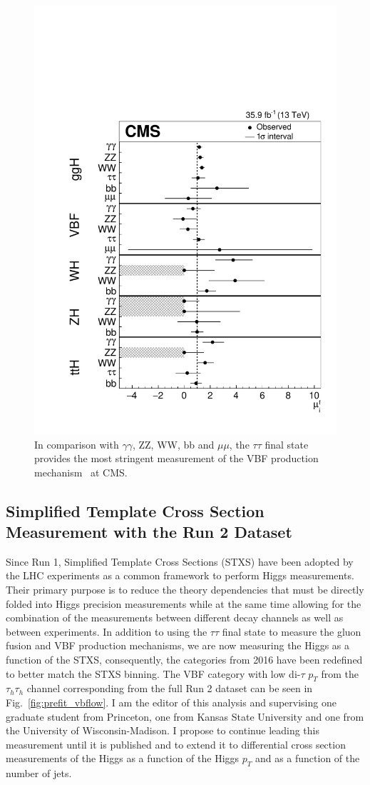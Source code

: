 \documentclass[preprint,12pt]{elsarticle}
\begin{document}
\begin{figure}[h]
\centering\includegraphics[width=0.4\linewidth]{CMS-HIG-17-031_Figure_006_VBF_Comparison.pdf}
\caption{In comparison with $\gamma\gamma$, ZZ, WW, bb and $\mu\mu$, the $\tau\tau$ final state provides the most stringent measurement of the VBF production mechanism~\cite{Sirunyan:2018koj} at CMS.}
\label{fig:Sirunyan2018koj}
\end{figure}

\subsection{Simplified Template Cross Section Measurement with the Run 2 Dataset}
Since Run 1, Simplified Template Cross Sections (STXS) have been adopted by the LHC 
experiments as a common framework to perform Higgs measurements. Their primary purpose 
is to reduce the theory 
dependencies that must be directly folded into Higgs precision measurements while at the same 
time allowing for the combination of the measurements between different decay channels as well 
as between experiments. In addition to using the $\tau\tau$ final state to measure the gluon
fusion and VBF production mechanisms, we are now measuring the Higgs as a function of the STXS,
consequently, the categories from 2016 have been redefined to better match the STXS binning.
The VBF category with low di-$\tau$ $p_{T}$ from the $\tau_{h}\tau_{h}$ channel corresponding
from the full Run 2 dataset can be seen in Fig.~\ref{fig:prefit_vbflow}.
I am the editor of this analysis and supervising one graduate student from Princeton,
one from Kansas State University and one from the University of Wisconsin-Madison.
I propose to continue leading this measurement until it is published and to extend
it to differential cross section measurements of the Higgs as a function
of the Higgs $p_{T}$ and as a function of the number of jets. 
\end{document}
